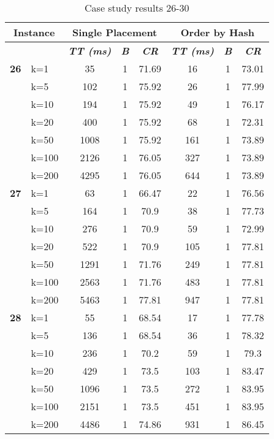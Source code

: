     \begin{table}[htbp]
    \caption{Case study results 26-30}
    \centering
    \begin{tabular}{|l|l|c|c|c|c|c|c|}
    \hline
    \multicolumn{ 2}{|c|}{\textbf{Instance}} & \multicolumn{ 3}{c|}{\textbf{Single Placement}} & \multicolumn{ 3}{c|}{\textbf{Order by Hash}} \\ \hline
    \multicolumn{ 2}{|l|}{} & \textbf{\textit{TT (ms)}} & \textbf{\textit{B}} & \textbf{\textit{CR}} & \textbf{\textit{TT (ms)}} & \textbf{\textit{B}} & \textbf{\textit{CR}} \\ \hline
    \multicolumn{1}{|r|}{\textbf{26}} & k=1 & 35 & 1 & 71.69 & 16 & 1 & 73.01 \\ 
     & k=5 & 102 & 1 & 75.92 & 26 & 1 & 77.99 \\ 
     & k=10 & 194 & 1 & 75.92 & 49 & 1 & 76.17 \\ 
     & k=20 & 400 & 1 & 75.92 & 68 & 1 & 72.31 \\ 
     & k=50 & 1008 & 1 & 75.92 & 161 & 1 & 73.89 \\ 
     & k=100 & 2126 & 1 & 76.05 & 327 & 1 & 73.89 \\ 
     & k=200 & 4295 & 1 & 76.05 & 644 & 1 & 73.89 \\ \hline
    \multicolumn{1}{|r|}{\textbf{27}} & k=1 & 63 & 1 & 66.47 & 22 & 1 & 76.56 \\ 
     & k=5 & 164 & 1 & 70.9 & 38 & 1 & 77.73 \\ 
     & k=10 & 276 & 1 & 70.9 & 59 & 1 & 72.99 \\ 
     & k=20 & 522 & 1 & 70.9 & 105 & 1 & 77.81 \\ 
     & k=50 & 1291 & 1 & 71.76 & 249 & 1 & 77.81 \\ 
     & k=100 & 2563 & 1 & 71.76 & 483 & 1 & 77.81 \\ 
     & k=200 & 5463 & 1 & 77.81 & 947 & 1 & 77.81 \\ \hline
    \multicolumn{1}{|r|}{\textbf{28}} & k=1 & 55 & 1 & 68.54 & 17 & 1 & 77.78 \\ 
     & k=5 & 136 & 1 & 68.54 & 36 & 1 & 78.32 \\ 
     & k=10 & 236 & 1 & 70.2 & 59 & 1 & 79.3 \\ 
     & k=20 & 429 & 1 & 73.5 & 103 & 1 & 83.47 \\ 
     & k=50 & 1096 & 1 & 73.5 & 272 & 1 & 83.95 \\ 
     & k=100 & 2151 & 1 & 73.5 & 451 & 1 & 83.95 \\ 
     & k=200 & 4486 & 1 & 74.86 & 931 & 1 & 86.45 \\ \hline

\end{tabular}
\end{table}
